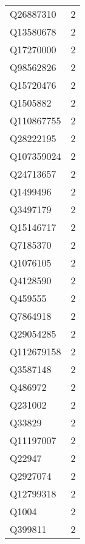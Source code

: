 \begin{tabular}{lr}
   Q26887310 &                             2 \\
   Q13580678 &                             2 \\
   Q17270000 &                             2 \\
   Q98562826 &                             2 \\
   Q15720476 &                             2 \\
    Q1505882 &                             2 \\
  Q110867755 &                             2 \\
   Q28222195 &                             2 \\
  Q107359024 &                             2 \\
   Q24713657 &                             2 \\
    Q1499496 &                             2 \\
    Q3497179 &                             2 \\
   Q15146717 &                             2 \\
    Q7185370 &                             2 \\
    Q1076105 &                             2 \\
    Q4128590 &                             2 \\
     Q459555 &                             2 \\
    Q7864918 &                             2 \\
   Q29054285 &                             2 \\
  Q112679158 &                             2 \\
    Q3587148 &                             2 \\
     Q486972 &                             2 \\
     Q231002 &                             2 \\
      Q33829 &                             2 \\
   Q11197007 &                             2 \\
      Q22947 &                             2 \\
    Q2927074 &                             2 \\
   Q12799318 &                             2 \\
       Q1004 &                             2 \\
     Q399811 &                             2 \\

\end{tabular}

